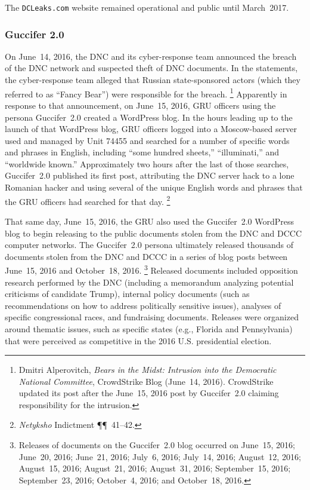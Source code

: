 The \verb+DCLeaks.com+ website remained operational and public until March~2017.

\subsubsection{Guccifer 2.0}

On June~14, 2016, the DNC and its cyber-response team announced the breach of the DNC network and suspected theft of DNC documents.
In the statements, the cyber-response team alleged that Russian state-sponsored actors (which they referred to as ``Fancy Bear'') were responsible for the breach.%
\footnote{Dmitri Alperovitch, \textit{Bears in the Midst: Intrusion into the Democratic National Committee}, CrowdStrike Blog (June~14, 2016).
CrowdStrike updated its post after the June~15, 2016 post by Guccifer~2.0 claiming responsibility for the intrusion.}
Apparently in response to that announcement, on June~15, 2016, GRU officers using the persona Guccifer~2.0 created a WordPress blog.
In the hours leading up to the launch of that WordPress blog, GRU officers logged into a Moscow-based server used and managed by Unit 74455 and searched for a number of specific words and phrases in English, including ``some hundred sheets,'' ``illuminati,'' and ``worldwide known.''
Approximately two hours after the last of those searches, Guccifer~2.0 published its first post, attributing the DNC server hack to a lone Romanian hacker and using several of the unique English words and phrases that the GRU officers had searched for that day.%
\footnote{\textit{Netyksho} Indictment \P\P~41--42.}

That same day, June~15, 2016, the GRU also used the Guccifer~2.0 WordPress blog to begin releasing to the public documents stolen from the DNC and DCCC computer networks.
The Guccifer~2.0 persona ultimately released thousands of documents stolen from the DNC and DCCC in a series of blog posts between June~15, 2016 and October~18, 2016.%
\footnote{Releases of documents on the Guccifer~2.0 blog occurred on June~15, 2016;
June~20, 2016;
June~21, 2016;
July~6, 2016;
July~14, 2016;
August~12, 2016;
August~15, 2016;
August~21, 2016;
August~31, 2016;
September~15, 2016;
September~23, 2016;
October~4, 2016;
and October~18, 2016.}
Released documents included opposition research performed by the DNC (including a memorandum analyzing potential criticisms of candidate Trump), internal policy documents (such as recommendations on how to address politically sensitive issues), analyses of specific congressional races, and fundraising documents.
Releases were organized around thematic issues, such as specific states (e.g., Florida and Pennsylvania) that were perceived as competitive in the 2016 U.S. presidential election.

